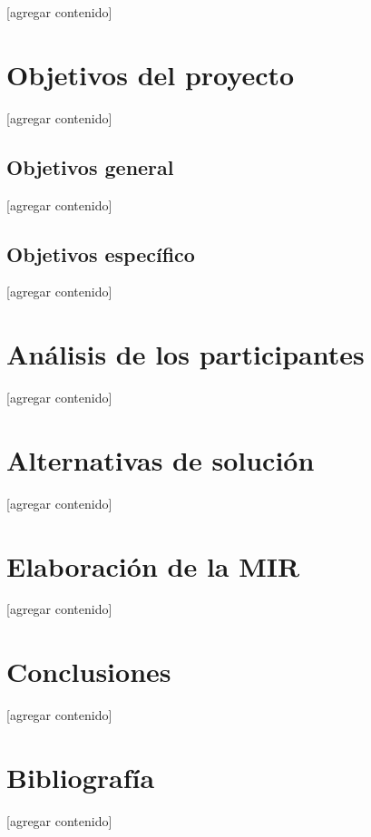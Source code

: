 \documentclass{article}
\begin{document}
[agregar contenido]

\section{Objetivos del proyecto}\label{sec:objs}
[agregar contenido]

\subsection{Objetivos general}\label{subsec:general-objs}
[agregar contenido]

\subsection{Objetivos específico}\label{subsec:specific-objs}
[agregar contenido]

\section{Análisis de los participantes}\label{sec:participants}
[agregar contenido]

\section{Alternativas de solución}\label{sec:alternatives}
[agregar contenido]

\section{Elaboración de la MIR}\label{sec:mir}
[agregar contenido]

\section{Conclusiones}\label{sec:conclutions}
[agregar contenido]

\section{Bibliografía}\label{sec:references}
[agregar contenido]
\end{document}
